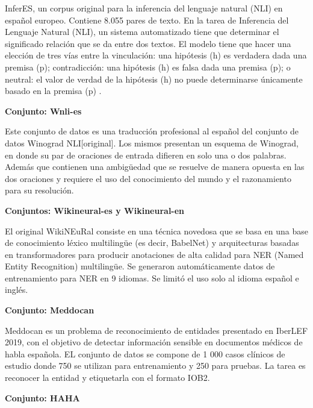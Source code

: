\begin{annexes}
InferES, un corpus original para la inferencia del lenguaje natural (NLI) en español europeo. Contiene 8.055 pares de texto. En la tarea de Inferencia del Lenguaje 
Natural (NLI), un sistema automatizado tiene que determinar el significado relación que se da entre dos textos. El modelo tiene que hacer una elección de tres vías 
entre la vinculación: una hipótesis (h) es verdadera dada una premisa (p); contradicción: una hipótesis (h) es falsa dada una premisa (p); o neutral: el valor de verdad 
de la hipótesis (h) no puede determinarse únicamente basado en la premisa (p) .

\begin{flushleft} 
    { \textbf{Conjunto: Wnli-es}}\label{description:wnli}
\end{flushleft}


Este conjunto de datos es una traducción profesional al español del conjunto de datos Winograd NLI[original]. Los mismos presentan un esquema de Winograd, en donde su 
par de oraciones de entrada difieren en solo una o dos palabras. Además que contienen una ambigüedad que se resuelve de manera opuesta en las dos oraciones y requiere 
el uso del conocimiento del mundo y el razonamiento para su resolución.

\begin{flushleft} 
    { \textbf{Conjuntos: Wikineural-es y Wikineural-en}}\label{description:wikineural}
\end{flushleft}

El original WikiNEuRal consiste en una técnica novedosa que se basa en una base de conocimiento léxico multilingüe (es decir, BabelNet) y arquitecturas basadas en 
transformadores para producir anotaciones de alta calidad para NER (Named Entity Recognition) multilingüe. Se generaron automáticamente datos de entrenamiento para 
NER en 9 idiomas. Se limitó el uso solo al idioma español e inglés.

\begin{flushleft} 
    { \textbf{Conjunto: Meddocan}}\label{description:meddocan}
\end{flushleft}

Meddocan es un problema de reconocimiento de entidades presentado en IberLEF 2019, con el objetivo de detectar información sensible en documentos médicos de habla española. 
EL conjunto de datos se compone de 1 000 casos clínicos de estudio donde 750 se utilizan para entrenamiento y 250 para pruebas. La tarea es reconocer la entidad y etiquetarla 
con el formato IOB2.

\begin{flushleft} 
    { \textbf{Conjunto: HAHA}}\label{description:haha}
\end{flushleft}


\end{annexes}
